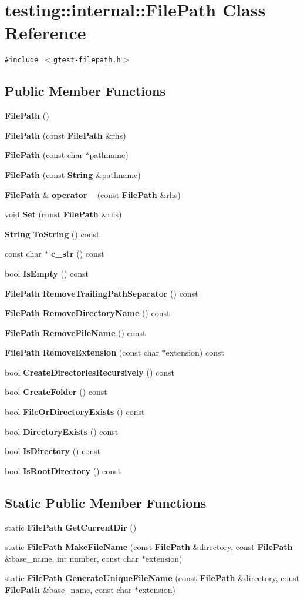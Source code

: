 \section{testing::internal::FilePath Class Reference}
\label{classtesting_1_1internal_1_1FilePath}
{\tt \#include $<$gtest-filepath.h$>$}

\subsection*{Public Member Functions}
\begin{CompactItemize}
\item 
{\bf FilePath} ()
\item 
{\bf FilePath} (const {\bf FilePath} \&rhs)
\item 
{\bf FilePath} (const char $\ast$pathname)
\item 
{\bf FilePath} (const {\bf String} \&pathname)
\item 
{\bf FilePath} \& {\bf operator=} (const {\bf FilePath} \&rhs)
\item 
void {\bf Set} (const {\bf FilePath} \&rhs)
\item 
{\bf String} {\bf ToString} () const
\item 
const char $\ast$ {\bf c\_\-str} () const
\item 
bool {\bf IsEmpty} () const
\item 
{\bf FilePath} {\bf RemoveTrailingPathSeparator} () const
\item 
{\bf FilePath} {\bf RemoveDirectoryName} () const
\item 
{\bf FilePath} {\bf RemoveFileName} () const
\item 
{\bf FilePath} {\bf RemoveExtension} (const char $\ast$extension) const
\item 
bool {\bf CreateDirectoriesRecursively} () const
\item 
bool {\bf CreateFolder} () const
\item 
bool {\bf FileOrDirectoryExists} () const
\item 
bool {\bf DirectoryExists} () const
\item 
bool {\bf IsDirectory} () const
\item 
bool {\bf IsRootDirectory} () const
\end{CompactItemize}
\subsection*{Static Public Member Functions}
\begin{CompactItemize}
\item 
static {\bf FilePath} {\bf GetCurrentDir} ()
\item 
static {\bf FilePath} {\bf MakeFileName} (const {\bf FilePath} \&directory, const {\bf FilePath} \&base\_\-name, int number, const char $\ast$extension)
\item 
static {\bf FilePath} {\bf GenerateUniqueFileName} (const {\bf FilePath} \&directory, const {\bf FilePath} \&base\_\-name, const char $\ast$extension)
\end{CompactItemize}
